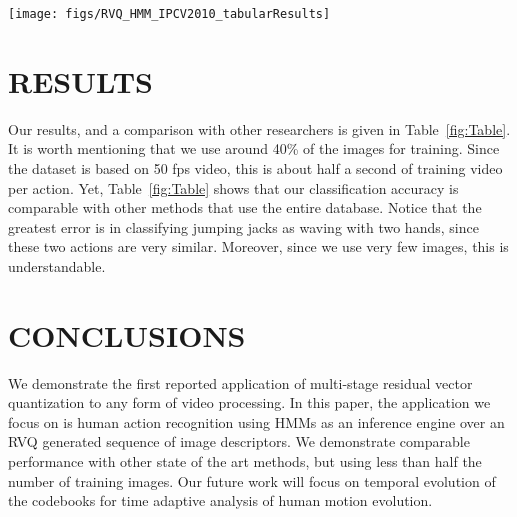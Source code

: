 \documentclass{article}
\begin{document}
			\begin{figure*}				
					\texttt{[image: figs/RVQ\_HMM\_IPCV2010\_tabularResults]}
					\centering
					\caption{Action confusion matrix.  We compare classification performance of our approach on 10 actions, walk (a1), run (a2), skip (a3), jumping jacks (a4), jumping (a5), in place jumping (a6), sideways motion (a7), waving with one hand (a8), waving with two hands (a9) and bending (a10) with other researchers using the same Weizmann dataset. (a) Our method, produces accurate results despite using less than half the training data. (b) Method reported in \cite{2007_JNL_SpaceTimeShapes_Gorelick}. (c) Method reported in \cite{2001_CNF_EventBasedAnalysisVideo_Manor} (d) Method reported in \cite{2010_JNL_ActionReconKinematic_Ali}.}
					\label{fig:Table}
			\end{figure*}




\section{RESULTS}
Our results, and a comparison with other researchers is given in Table~\ref{fig:Table}.  It is worth mentioning that we use around 40\% of the images for training.  Since the dataset is based on 50 fps video, this is about half a second of training video per action.  Yet, Table~\ref{fig:Table} shows that our classification accuracy is comparable with other methods that use the entire database.  Notice that the greatest error is in classifying jumping jacks as waving with two hands, since these two actions are very similar.  Moreover, since we use very few images, this is understandable.  


\section{CONCLUSIONS}
We demonstrate the first reported application of multi-stage residual vector quantization to any form of video processing.  In this paper, the application we focus on is human action recognition using HMMs as an inference engine over an RVQ generated sequence of image descriptors.  We demonstrate comparable performance with other state of the art methods, but using less than half the number of training images.  Our future work will focus on temporal evolution of the codebooks for time adaptive analysis of human motion evolution.
\end{document}
